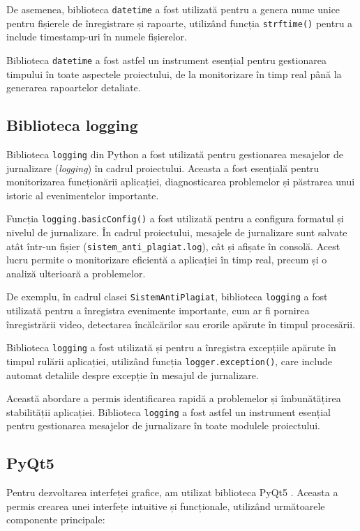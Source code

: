 \documentclass[12pt,a4paper]{article}
\begin{document}
De asemenea, biblioteca \texttt{datetime} a fost utilizată pentru a genera nume unice pentru fișierele de înregistrare și rapoarte, utilizând funcția \texttt{strftime()} pentru a include timestamp-uri în numele fișierelor.

Biblioteca \texttt{datetime} a fost astfel un instrument esențial pentru gestionarea timpului în toate aspectele proiectului, de la monitorizare în timp real până la generarea rapoartelor detaliate.

\subsection{Biblioteca logging}
Biblioteca \texttt{logging}\cite{logging} din Python a fost utilizată pentru gestionarea mesajelor de jurnalizare (\textit{logging}) în cadrul proiectului. Aceasta a fost esențială pentru monitorizarea funcționării aplicației, diagnosticarea problemelor și păstrarea unui istoric al evenimentelor importante.

Funcția \texttt{logging.basicConfig()} a fost utilizată pentru a configura formatul și nivelul de jurnalizare. În cadrul proiectului, mesajele de jurnalizare sunt salvate atât într-un fișier (\texttt{sistem\_anti\_plagiat.log}), cât și afișate în consolă. Acest lucru permite o monitorizare eficientă a aplicației în timp real, precum și o analiză ulterioară a problemelor.

De exemplu, în cadrul clasei \texttt{SistemAntiPlagiat}, biblioteca \texttt{logging} a fost utilizată pentru a înregistra evenimente importante, cum ar fi pornirea înregistrării video, detectarea încălcărilor sau erorile apărute în timpul procesării.

Biblioteca \texttt{logging} a fost utilizată și pentru a înregistra excepțiile apărute în timpul rulării aplicației, utilizând funcția \texttt{logger.exception()}, care include automat detaliile despre excepție în mesajul de jurnalizare.

Această abordare a permis identificarea rapidă a problemelor și îmbunătățirea stabilității aplicației. Biblioteca \texttt{logging} a fost astfel un instrument esențial pentru gestionarea mesajelor de jurnalizare în toate modulele proiectului.

\subsection{PyQt5}
Pentru dezvoltarea interfeței grafice, am utilizat biblioteca PyQt5 \cite{pyqt5}. Aceasta a permis crearea unei interfețe intuitive și funcționale, utilizând următoarele componente principale:
\end{document}
